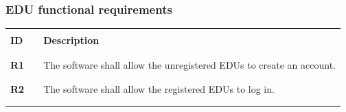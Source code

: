 \subsubsection*{EDU functional requirements}
\renewcommand{\arraystretch}{0.5}
\begin{longtable}[H]{l l p{12cm}}
    \hline
                 &        &                                                                                                                                                                                                                                                                          \\
    \textbf{ID}  & \vline & \textbf{Description}                                                                                                                                                                                                                                                     \\
                 &        &                                                                                                                                                                                                                                                                          \\\hline & & \\
    \textbf{R1}  & \vline & The software shall allow the unregistered EDUs to create an account.                                                                                                                                                                                                     \\
                 &        &                                                                                                                                                                                                                                                                          \\\hline & & \\
    \textbf{R2}  & \vline & The software shall allow the registered EDUs to log in.                                                                                                                                                                                                                  \\
                 &        &                                                                                                                                                                                                                                                                          \\\hline & & \\

\end{longtable}
